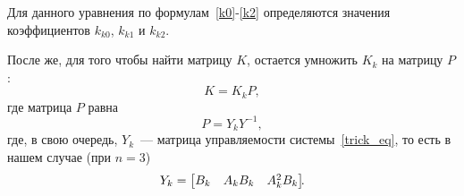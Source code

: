\documentclass[12pt,a4paper,openany]{extarticle}
\begin{document}
Для данного уравнения по формулам~\eqref{k0}-\eqref{k2} определяются значения коэффициентов $k_{k0}$, $k_{k1}$ и $k_{k2}$.

После же, для того чтобы найти матрицу $K$\!, остается умножить $K_k$ на матрицу $P$:
\begin{equation}
	K = K_kP\!,
\end{equation}
где матрица $P$ равна
\begin{equation}
	P = Y_kY^{-1}\!\!\!\!\!\!\!,
\end{equation}
где, в свою очередь, $Y_k$~--- матрица управляемости системы~\eqref{trick_eq}, то есть в нашем случае (при $n=3$)
\begin{equation}
	Y_k = 
	\begin{bmatrix}
		B_k & A_kB_k & A_k^2B_k	
	\end{bmatrix}\!\!\ldotp
\end{equation}
\end{document}
